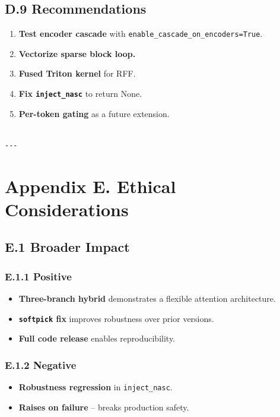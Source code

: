 \subsection{D.9 Recommendations}

\begin{enumerate}
\item \textbf{Test encoder cascade} with \texttt{enable\_cascade\_on\_encoders=True}.
\item \textbf{Vectorize sparse block loop.}
\item \textbf{Fused Triton kernel} for RFF.
\item \textbf{Fix \texttt{inject\_nasc}} to return None.
\item \textbf{Per-token gating} as a future extension.
\end{enumerate}
\begin{lstlisting}

---
\end{lstlisting}


\section{Appendix E. Ethical Considerations}

\subsection{E.1 Broader Impact}

\subsubsection{E.1.1 Positive}

\begin{itemize}
\item \textbf{Three-branch hybrid} demonstrates a flexible attention architecture.
\item \textbf{\texttt{softpick} fix} improves robustness over prior versions.
\item \textbf{Full code release} enables reproducibility.

\end{itemize}
\subsubsection{E.1.2 Negative}

\begin{itemize}
\item \textbf{Robustness regression} in \texttt{inject\_nasc}.
\item \textbf{Raises on failure} -- breaks production safety.

\end{itemize}
